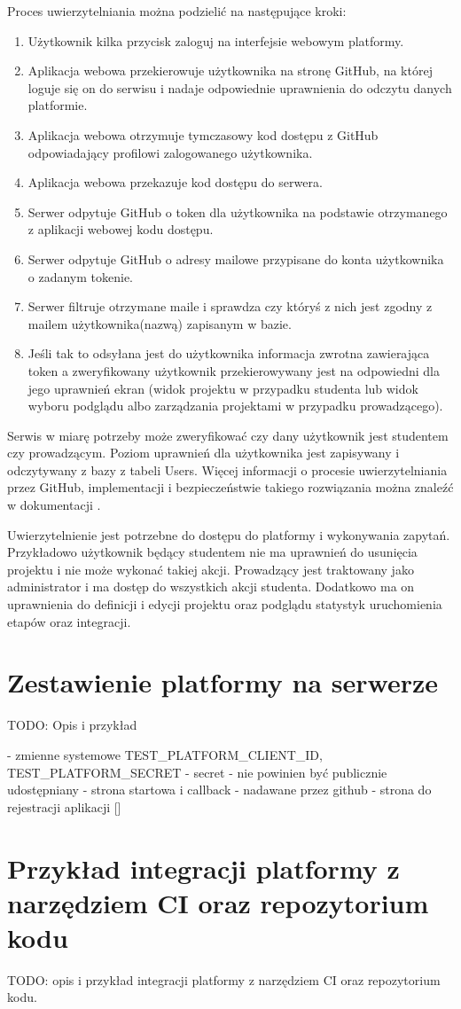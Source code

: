 Proces uwierzytelniania można podzielić na następujące kroki:
\begin{enumerate}
\item Użytkownik kilka przycisk zaloguj na interfejsie webowym platformy.
\item Aplikacja webowa przekierowuje użytkownika na stronę GitHub, na której loguje się on do serwisu i nadaje odpowiednie uprawnienia do odczytu danych platformie.
\item Aplikacja webowa otrzymuje tymczasowy kod dostępu z GitHub odpowiadający profilowi zalogowanego użytkownika.
\item Aplikacja webowa przekazuje kod dostępu do serwera.
\item Serwer odpytuje GitHub o token dla użytkownika na podstawie otrzymanego z aplikacji webowej kodu dostępu.
\item Serwer odpytuje GitHub o adresy mailowe przypisane do konta użytkownika o zadanym tokenie.
\item Serwer filtruje otrzymane maile i sprawdza czy któryś z nich jest zgodny z mailem użytkownika(nazwą) zapisanym w bazie.
\item Jeśli tak to odsyłana jest do użytkownika informacja zwrotna zawierająca token a zweryfikowany użytkownik przekierowywany jest na odpowiedni dla jego uprawnień ekran (widok projektu w przypadku studenta lub widok wyboru podglądu albo zarządzania projektami w przypadku prowadzącego).
\end{enumerate}

Serwis w miarę potrzeby może zweryfikować czy dany użytkownik jest studentem czy prowadzącym.
Poziom uprawnień dla użytkownika jest zapisywany i odczytywany z bazy z tabeli Users.
Więcej informacji o procesie uwierzytelniania przez GitHub, implementacji i bezpieczeństwie takiego rozwiązania można znaleźć w dokumentacji \cite{gitHub-auth-basic} \cite{gitHub-oauth-app}.

Uwierzytelnienie jest potrzebne do dostępu do platformy i wykonywania zapytań.
Przykładowo użytkownik będący studentem nie ma uprawnień do usunięcia projektu i nie może wykonać takiej akcji.
Prowadzący jest traktowany jako administrator i ma dostęp do wszystkich akcji studenta.
Dodatkowo ma on uprawnienia do definicji i edycji projektu oraz podglądu statystyk uruchomienia etapów oraz integracji.

\section {Zestawienie platformy na serwerze}
\label{run-platform}

TODO: Opis i przykład

- zmienne systemowe TEST\_PLATFORM\_CLIENT\_ID, TEST\_PLATFORM\_SECRET
- secret - nie powinien być publicznie udostępniany
- strona startowa i callback
- nadawane przez github
- strona do rejestracji aplikacji []

\section {Przykład integracji platformy z narzędziem CI oraz repozytorium kodu}
\label{ci-integration}

TODO: opis i przykład integracji platformy z narzędziem CI oraz repozytorium
kodu.